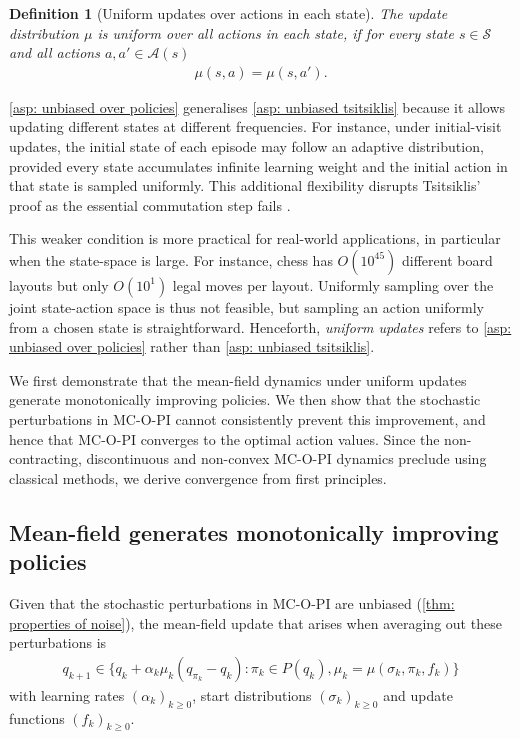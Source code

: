 \documentclass[twoside,11pt]{article}
\newtheorem{definition}[definition]{Definition}
\newcommand{\aset}{\mathcal{A}}
\newcommand{\sset}{\mathcal{S}}
\newcommand{\pol}{\pi}
\newcommand{\update}{\mu}
\newcommand{\start}{\sigma}
\newcommand{\grpol}{P}
\newcommand{\lrate}{\alpha}
\DeclareRobustCommand{\reviewbarstart}{%
  \ifhmode %
    \vadjust{\vbox to 0pt{%
      \vskip-\ht\strutbox %
      \vskip-\dp\strutbox %
      \cbstart[\changebarwidth] %
      \vss %
    }}%
  \else %
    \cbstart[\changebarwidth]%
  \fi %
} %
\providecommand{\DIFadd}[1]{#1} %
\providecommand{\DIFaddbegin}{\reviewbarstart} %
\providecommand{\DIFaddend}{\protect\cbend} %
\def\DIFadd#1{#1}%
\def\DIFaddbegin{}%
\def\DIFaddend{}%
\begin{document}
\begin{definition}[Uniform updates over actions in each state]
\label{asp: unbiased over policies}
The update distribution $\update$ is uniform over all actions in each state,
if for every state $s \in \sset$ and all actions $a, a' \in \aset(s)$
\begin{align*}
    \mu(s, a) = \mu(s, a') .
\end{align*}
\end{definition}

\autoref{asp: unbiased over policies} generalises \autoref{asp: unbiased tsitsiklis} because it allows updating different states at different frequencies.
For instance, under initial-visit updates, the initial state of each episode  \DIFaddbegin \DIFadd{may follow an adaptive distribution, provided every state accumulates infinite learning weight and }\DIFaddend the initial action in that state is sampled uniformly.
This additional flexibility disrupts Tsitsiklis' proof as the essential commutation step fails \citep[p.~64]{Tsitsiklis2002OnIteration}.

This weaker condition is more practical for real-world applications, in particular when the state-space is large.
For instance, chess has $O(10^{45})$ different board layouts but only $O (10^1)$ legal moves per layout.
Uniformly sampling over the joint state-action space is thus not feasible, but sampling an action uniformly from a chosen state is straightforward.
Henceforth, \textit{uniform updates} refers to \autoref{asp: unbiased over policies} rather than \autoref{asp: unbiased tsitsiklis}.


We first demonstrate that the mean-field dynamics under uniform updates generate monotonically improving policies.
We then show that the stochastic perturbations in MC-O-PI cannot consistently prevent this improvement, and hence that MC-O-PI converges to the optimal action values.
Since the non-contracting, discontinuous and non-convex MC-O-PI dynamics preclude using classical methods, we derive convergence from first principles.


\subsection{Mean-field generates monotonically improving policies}

Given that the stochastic perturbations in  MC-O-PI are unbiased (\autoref{thm: properties of noise}),
the mean-field update that arises when averaging out these perturbations is
\begin{align}
\label{eq: deterministic mcopi}
    q_{k+1}
    \in
    \big\{ q_k + \lrate_k \update_k ( q_{\pi_k} - q_k )
    :
    \pol_k \in \grpol(q_k),
    \update_k = \update(\start_k, \pol_k, f_k)
    \big\}
\end{align}
with learning rates $(\alpha_k)_{k\ge 0}$, start distributions $(\sigma_k)_{k\ge 0}$ and update functions $(f_k)_{k\ge 0}$.
\end{document}
